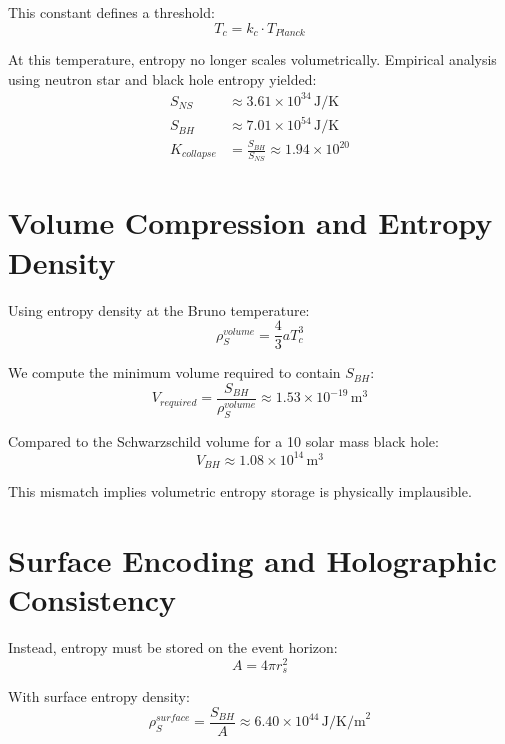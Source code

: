 \documentclass[12pt]{article}
\begin{document}
This constant defines a threshold:
\begin{equation}
T_c = k_c \cdot T_{Planck}
\end{equation}

At this temperature, entropy no longer scales volumetrically. Empirical analysis using neutron star and black hole entropy yielded:
\begin{align}
S_{NS} &\approx 3.61 \times 10^{34} \, \text{J/K} \\
S_{BH} &\approx 7.01 \times 10^{54} \, \text{J/K} \\
K_{collapse} &= \frac{S_{BH}}{S_{NS}} \approx 1.94 \times 10^{20}
\end{align}

\section{Volume Compression and Entropy Density}

Using entropy density at the Bruno temperature:
\begin{equation}
\rho_S^{volume} = \frac{4}{3} a T_c^3
\end{equation}

We compute the minimum volume required to contain $S_{BH}$:
\begin{equation}
V_{required} = \frac{S_{BH}}{\rho_S^{volume}} \approx 1.53 \times 10^{-19} \, \text{m}^3
\end{equation}

Compared to the Schwarzschild volume for a 10 solar mass black hole:
\begin{equation}
V_{BH} \approx 1.08 \times 10^{14} \, \text{m}^3
\end{equation}

This mismatch implies volumetric entropy storage is physically implausible.

\section{Surface Encoding and Holographic Consistency}

Instead, entropy must be stored on the event horizon:
\begin{equation}
A = 4\pi r_s^2
\end{equation}

With surface entropy density:
\begin{equation}
\rho_S^{surface} = \frac{S_{BH}}{A} \approx 6.40 \times 10^{44} \, \text{J/K/m}^2
\end{equation}
\end{document}
